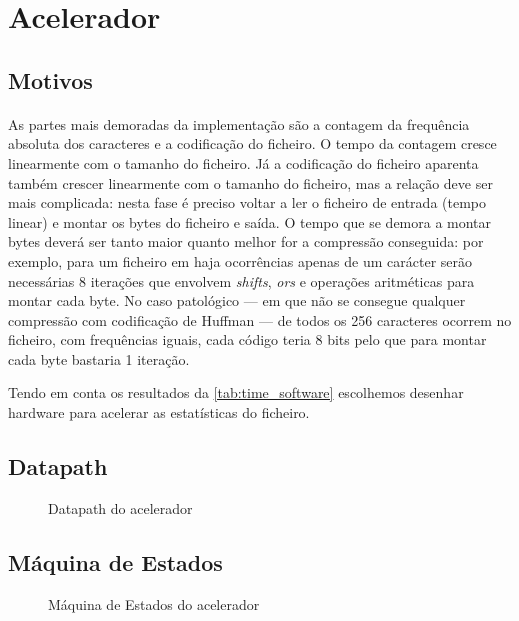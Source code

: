 \documentclass[a4paper]{article}
\begin{document}
	\section{Acelerador}
	\label{sec:accelerator}

  \subsection{Motivos}
  \paragraph{} As partes mais demoradas da implementação são a contagem da frequência absoluta dos caracteres e a codificação do ficheiro. O tempo da contagem cresce linearmente com o tamanho do ficheiro. Já a codificação do ficheiro aparenta também crescer linearmente com o tamanho do ficheiro, mas a relação deve ser mais complicada: nesta fase é preciso voltar a ler o ficheiro de entrada (tempo linear) e montar os bytes do ficheiro e saída. O tempo que se demora a montar bytes deverá ser tanto maior quanto melhor for a compressão conseguida: por exemplo, para um ficheiro em haja ocorrências apenas de um carácter serão necessárias 8 iterações que envolvem \textit{shifts}, \textit{ors} e operações aritméticas para montar cada byte. No caso patológico --- em que não se consegue qualquer compressão com codificação de Huffman --- de todos os 256 caracteres ocorrem no ficheiro, com frequências iguais, cada código teria 8 bits pelo que para montar cada byte bastaria 1 iteração.

  Tendo em conta os resultados da \autoref{tab:time_software} escolhemos desenhar hardware para acelerar as estatísticas do ficheiro.

  \subsection{Datapath}

	\begin{figure}[H]
		\centering
		\caption{Datapath do acelerador}
		\label{fig:hw_datapath}
	\end{figure}

  \subsection{Máquina de Estados}
	\begin{figure}[H]
		\centering
		\caption{Máquina de Estados do acelerador}
		\label{fig:hw_fsm}
	\end{figure}
\end{document}
